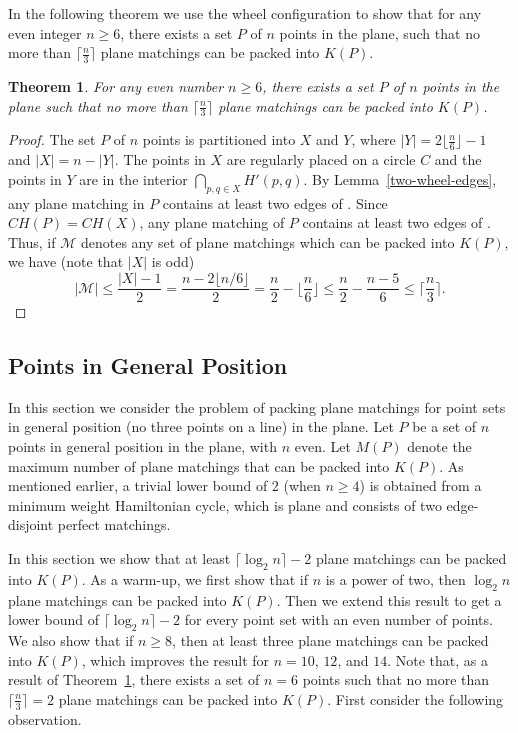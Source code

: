 \documentclass[11pt,a4paper]{article}
\newcommand{\CH}[1]{\text{$CH(#1)$}}
\newcommand{\Kn}[1]{K#1}
\newtheorem{theorem}{Theorem}
\begin{document}
In the following theorem we use the wheel configuration to show that for any even integer $n\ge 6$, there exists a set $P$ of $n$ points in the plane, such that no more than $\lceil\frac{n}{3}\rceil$ plane matchings can be packed into $\Kn{(P)}$. 

\begin{theorem}
\label{n-over-3-thr}
For any even number $n\ge 6$, there exists a set $P$ of $n$ points in the plane such that no more than $\lceil\frac{n}{3}\rceil$ plane matchings can be packed into $\Kn{(P)}$.
\end{theorem}
\begin{proof}
The set $P$ of $n$ points is partitioned into $X$ and $Y$, where $|Y|=2\lfloor\frac{n}{6}\rfloor-1$ and $|X|=n-|Y|$. The points in $X$ are regularly placed on a circle $C$ and the points in $Y$ are in the interior $\bigcap_{p,q\in X}H'(p,q)$. By Lemma~\ref{two-wheel-edges}, any plane matching in $P$ contains at least two edges of \CH{P}.
Since $\CH{P}=\CH{X}$, any plane matching of $P$ contains at least two edges of \CH{X}. Thus, if $\mathcal{M}$ denotes any set of plane matchings which can be packed into $\Kn{(P)}$, we have (note that $|X|$ is odd)
$$|\mathcal{M}|\le \frac{|X|-1}{2}=\frac{n-2\lfloor n/6\rfloor}{2}=\frac{n}{2}-\lfloor\frac{n}{6}\rfloor\le \frac{n}{2}-\frac{n-5}{6}\le \lceil\frac{n}{3}\rceil.$$
\end{proof}

\subsection{Points in General Position}
\label{general-position-section}
In this section we consider the problem of packing plane matchings for point sets in general position (no three points on a line) in the plane. 
Let $P$ be a set of $n$ points in general position in the plane, with $n$ even. Let $M(P)$ denote the maximum number of plane matchings that can be packed into $\Kn{(P)}$. As mentioned earlier, a trivial lower bound of $2$ (when $n \ge 4$) is obtained from a minimum weight Hamiltonian cycle, which is plane and consists of two edge-disjoint perfect matchings. 

In this section we show that at least $\lceil\log_2{n}\rceil-2$ plane matchings can be packed into $\Kn{(P)}$. As a warm-up, we first show that if $n$ is a power of two, then $\log_2{n}$ plane matchings can be packed into $\Kn{(P)}$. Then we extend this result to get a lower bound of $\lceil\log_2{n}\rceil-2$ for every point set with an even number of points. We also show that if $n\ge 8$, then at least three plane matchings can be packed into $\Kn{(P)}$, which improves the result for $n=10$, $12$, and $14$. Note that, as a result of Theorem~\ref{n-over-3-thr}, there exists a set of $n=6$ points such that no more than $\lceil\frac{n}{3}\rceil=2$ plane matchings can be packed into $\Kn{(P)}$. First consider the following observation.
\end{document}
